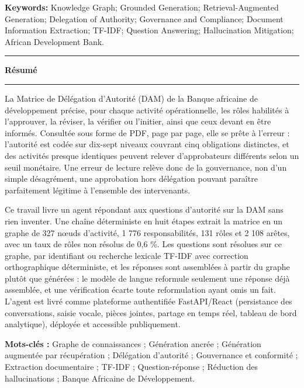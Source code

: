\begin{singlespace}
\vspace{0.12cm}

\noindent\textbf{Keywords:} Knowledge Graph; Grounded Generation; Retrieval-Augmented
Generation; Delegation of Authority; Governance and Compliance; Document Information
Extraction; TF-IDF; Question Answering; Hallucination Mitigation; African Development
Bank.

\vspace{0.2cm}
\noindent\textcolor{myblue}{\rule{\textwidth}{1.1pt}}
\vspace{0.12cm}


{\noindent\Large\sffamily\bfseries Résumé\par}

\vspace{0.1cm}
\noindent\textcolor{myblue}{\rule{\textwidth}{1.1pt}}

\vspace{0.15cm}

\noindent La Matrice de Délégation d'Autorité (DAM) de la Banque africaine de
développement précise, pour chaque activité opérationnelle, les rôles habilités à
l'approuver, la réviser, la vérifier ou l'initier, ainsi que ceux devant en être
informés. Consultée sous forme de PDF, page par page, elle se prête à l'erreur :
l'autorité est codée sur dix-sept niveaux couvrant cinq obligations distinctes, et des
activités presque identiques peuvent relever d'approbateurs différents selon un seuil
monétaire. Une erreur de lecture relève donc de la gouvernance, non d'un simple
désagrément, une approbation hors délégation pouvant paraître parfaitement légitime à
l'ensemble des intervenants.

\vspace{0.15cm}

\noindent Ce travail livre un agent répondant aux questions d'autorité sur la DAM sans
rien inventer. Une chaîne déterministe en huit étapes extrait la matrice en un graphe de
327 nœuds d'activité, 1 776 responsabilités, 131 rôles et 2 108 arêtes, avec un taux de
rôles non résolus de 0,6 \%. Les questions sont résolues sur ce graphe, par identifiant ou
recherche lexicale TF-IDF avec correction orthographique déterministe, et les réponses
sont assemblées à partir du graphe plutôt que générées : le modèle de langue reformule
seulement une réponse déjà assemblée, et une vérification écarte toute reformulation
ayant omis un fait. L'agent est livré comme plateforme authentifiée FastAPI/React
(persistance des conversations, saisie vocale, pièces jointes, partage en temps réel,
tableau de bord analytique), déployée et accessible publiquement.

\vspace{0.1cm}

\noindent\textbf{Mots-clés :} Graphe de connaissances ; Génération ancrée ; Génération
augmentée par récupération ; Délégation d'autorité ; Gouvernance et conformité ;
Extraction documentaire ; TF-IDF ; Question-réponse ; Réduction des hallucinations ;
Banque Africaine de Développement.

\end{singlespace}

